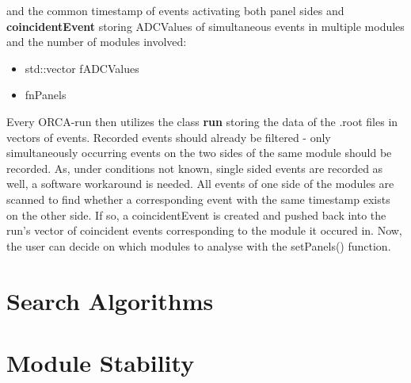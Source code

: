     and the common timestamp of events activating both panel sides and\\
    {\bf coincidentEvent} storing ADCValues of simultaneous events in multiple modules and the number of modules involved:
    \begin{itemize}
    	\item std::vector fADCValues
    	\item fnPanels
    \end{itemize}
    Every ORCA-run then utilizes the class {\bf run} storing the data of the .root files in vectors of events.    
    Recorded events should already be filtered - only simultaneously occurring events on the two sides of the same module should be recorded. As, under conditions not known, single sided events are recorded as well, a software workaround is needed. All events of one side of the modules are scanned to find whether a corresponding event with the same timestamp exists on the other side. If so, a coincidentEvent is created and pushed back into the run's vector of coincident events corresponding to the module it occured in.
    Now, the user can decide on which modules to analyse with the setPanels() function.
  
  \section{Search Algorithms}
  \label{ch:Analysis software:sec:Search algorithms}
  
  \section{Module Stability}
  \label{ch:Analysis software:sec:Module Stability}
